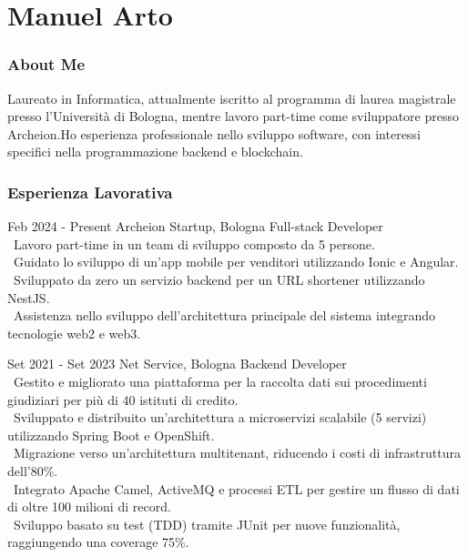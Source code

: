 \documentclass{tccv}
\begin{document}
\part{Manuel Arto}

\section{About Me}

Laureato in Informatica, attualmente iscritto al programma di laurea magistrale presso l'Università di Bologna, mentre lavoro part-time come sviluppatore presso Archeion.\newline Ho esperienza professionale nello sviluppo software, con interessi specifici nella programmazione backend e blockchain.

\section{Esperienza Lavorativa}

\begin{eventlist}

     \item{Feb 2024 - Present}
     {Archeion Startup, Bologna}
     {Full-stack Developer} \\
     \textbullet~Lavoro part-time in un team di sviluppo composto da 5 persone. \\
     \textbullet~Guidato lo sviluppo di un'app mobile per venditori utilizzando Ionic e Angular. \\
     \textbullet~Sviluppato da zero un servizio backend per un URL shortener utilizzando NestJS. \\
     \textbullet~Assistenza nello sviluppo dell'architettura principale del sistema integrando tecnologie web2 e web3.

     \item{Set 2021 - Set 2023}
     {Net Service, Bologna}
     {Backend Developer} \\
     \textbullet~Gestito e migliorato una piattaforma per la raccolta dati sui procedimenti giudiziari per più di 40 istituti di credito. \\
     \textbullet~Sviluppato e distribuito un'architettura a microservizi scalabile (5 servizi) utilizzando Spring Boot e OpenShift. \\
     \textbullet~Migrazione verso un'architettura multitenant, riducendo i costi di infrastruttura dell'80\%. \\
     \textbullet~Integrato Apache Camel, ActiveMQ e processi ETL per gestire un flusso di dati di oltre 100 milioni di record. \\
     \textbullet~Sviluppo basato su test (TDD) tramite JUnit per nuove funzionalità, raggiungendo una coverage 75\%.

\end{eventlist}
\end{document}

